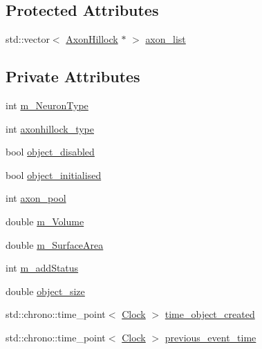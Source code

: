 \subsection*{Protected Attributes}
\begin{DoxyCompactItemize}
\item 
std\+::vector$<$ \mbox{\hyperlink{classAxonHillock}{Axon\+Hillock}} $\ast$ $>$ \mbox{\hyperlink{classAxonHillock_a110d655ded8e09306b224b6e940cd60b}{axon\+\_\+list}}
\end{DoxyCompactItemize}
\subsection*{Private Attributes}
\begin{DoxyCompactItemize}
\item 
int \mbox{\hyperlink{classAxonHillock_a1b3e5f60e24589baa3937c25d0fdaccb}{m\+\_\+\+Neuron\+Type}}
\item 
int \mbox{\hyperlink{classAxonHillock_abcf4792c5f64683a2ba6b3ad11b36c3b}{axonhillock\+\_\+type}}
\item 
bool \mbox{\hyperlink{classAxonHillock_aceaf38b22f77d3377d96e79d44b6c3d6}{object\+\_\+disabled}}
\item 
bool \mbox{\hyperlink{classAxonHillock_ac666d677d62505d33b1316f5688f1529}{object\+\_\+initialised}}
\item 
int \mbox{\hyperlink{classAxonHillock_a5128d2562b42d29b7bfc1492bfce7066}{axon\+\_\+pool}}
\item 
double \mbox{\hyperlink{classAxonHillock_ab475b735c12d372dc9227e84f8a5fe89}{m\+\_\+\+Volume}}
\item 
double \mbox{\hyperlink{classAxonHillock_ae8b94f0128e95735b088e2ed68bc1884}{m\+\_\+\+Surface\+Area}}
\item 
int \mbox{\hyperlink{classAxonHillock_a92b376c3bc0bf8f8a52f52e424f7a335}{m\+\_\+add\+Status}}
\item 
double \mbox{\hyperlink{classAxonHillock_a2b87848d4ae4bb3011347cb11656ee09}{object\+\_\+size}}
\item 
std\+::chrono\+::time\+\_\+point$<$ \mbox{\hyperlink{universe_8h_a0ef8d951d1ca5ab3cfaf7ab4c7a6fd80}{Clock}} $>$ \mbox{\hyperlink{classAxonHillock_ab8fe082b0aa59b58f6cf8ddb00202ae1}{time\+\_\+object\+\_\+created}}
\item 
std\+::chrono\+::time\+\_\+point$<$ \mbox{\hyperlink{universe_8h_a0ef8d951d1ca5ab3cfaf7ab4c7a6fd80}{Clock}} $>$ \mbox{\hyperlink{classAxonHillock_a569d0a3da91ca87f6e88a8cdb0949e81}{previous\+\_\+event\+\_\+time}}

\end{DoxyCompactItemize}

